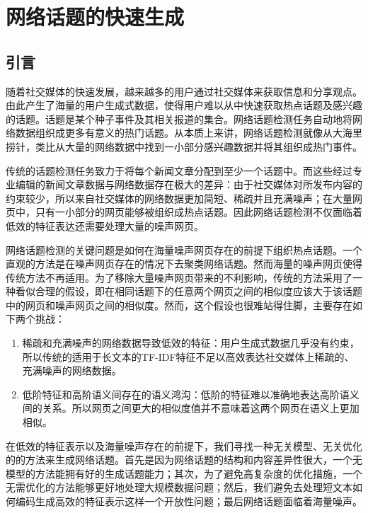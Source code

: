 \chapter{网络话题的快速生成}\label{chap:topicGeneration}
\section{引言}

随着社交媒体的快速发展，越来越多的用户通过社交媒体来获取信息和分享观点。由此产生了海量的用户生成式数据，使得用户难以从中快速获取热点话题及感兴趣的话题。话题是某个种子事件及其相关报道的集合。网络话题检测任务自动地将网络数据组织成更多有意义的热门话题。从本质上来讲，网络话题检测就像从大海里捞针，类比从大量的网络数据中找到一小部分感兴趣数据并将其组织成热门事件。

传统的话题检测任务致力于将每个新闻文章分配到至少一个话题中。而这些经过专业编辑的新闻文章数据与网络数据存在极大的差异：由于社交媒体对所发布内容的约束较少，所以来自社交媒体的网络数据更加简短、稀疏并且充满噪声；在大量网页中，只有一小部分的网页能够被组织成热点话题。因此网络话题检测不仅面临着低效的特征表达还需要处理大量的噪声网页。

网络话题检测的关键问题是如何在海量噪声网页存在的前提下组织热点话题。一个直观的方法是在噪声网页存在的情况下去聚类网络话题。然而海量的噪声网页使得传统方法不再适用。为了移除大量噪声网页带来的不利影响，传统的方法采用了一种看似合理的假设，即在相同话题下的任意两个网页之间的相似度应该大于该话题中的网页和噪声网页之间的相似度。然而，这个假设也很难站得住脚，主要存在如下两个挑战：

\begin{enumerate}
\renewcommand{\labelenumi}{\theenumi)}
    \item 稀疏和充满噪声的网络数据导致低效的特征：用户生成式数据几乎没有约束，所以传统的适用于长文本的TF-IDF特征不足以高效表达社交媒体上稀疏的、充满噪声的网络数据。
    \item 低阶特征和高阶语义间存在的语义鸿沟：低阶的特征难以准确地表达高阶语义间的关系。所以网页之间更大的相似度值并不意味着这两个网页在语义上更加相似。
\end{enumerate}

在低效的特征表示以及海量噪声存在的前提下，我们寻找一种无关模型、无关优化的的方法来生成网络话题。首先是因为网络话题的结构和内容差异性很大，一个无模型的方法能拥有好的生成话题能力；其次，为了避免高复杂度的优化措施，一个无需优化的方法能够更好地处理大规模数据问题；然后，我们避免去处理短文本如何编码生成高效的特征表示这样一个开放性问题；最后网络话题面临着海量噪声。


